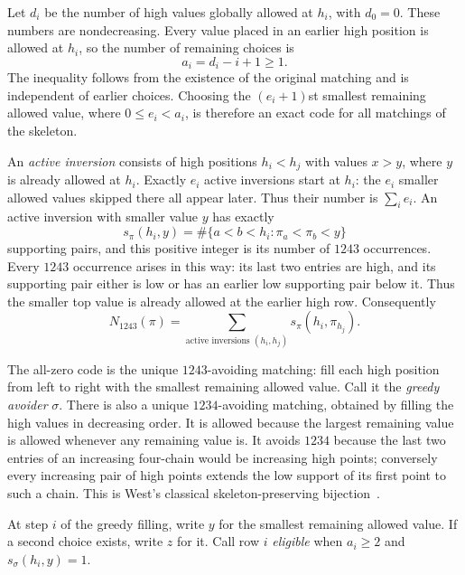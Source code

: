 \documentclass[11pt,letterpaper]{article}
\theoremstyle{remark}\newtheorem{remark}[theorem]{Remark}
\numberwithin{equation}{section}
\begin{document}
Let $d_i$ be the number of high values globally allowed at $h_i$, with
$d_0=0$. These numbers are nondecreasing. Every value placed in an earlier
high position is allowed at $h_i$, so the number of remaining choices is
\begin{equation}\label{upo:1243:eq:choices}
 a_i=d_i-i+1\ge1.
\end{equation}
The inequality follows from the existence of the original matching and
is independent of earlier choices. Choosing the $(e_i+1)$st smallest
remaining allowed value, where $0\le e_i<a_i$, is therefore an exact code
for all matchings of the skeleton.

An \emph{active inversion} consists of high positions $h_i<h_j$ with
values $x>y$, where $y$ is already allowed at $h_i$. Exactly $e_i$ active
inversions start at $h_i$: the $e_i$ smaller allowed values skipped there
all appear later. Thus their number is $\sum_i e_i$. An active inversion
with smaller value $y$ has exactly
\[
 s_\pi(h_i,y)=\#\{a<b<h_i:\pi_a<\pi_b<y\}
\]
supporting pairs, and this positive integer is its number of $1243$
occurrences. Every $1243$ occurrence arises in this way: its last two entries are
high, and its supporting pair either is low or has an earlier low
supporting pair below it. Thus the smaller top value is already allowed
at the earlier high row. Consequently
\begin{equation}\label{upo:1243:eq:active}
 N_{1243}(\pi)=\sum_{\text{active inversions }(h_i,h_j)}
                    s_\pi(h_i,\pi_{h_j}).
\end{equation}

The all-zero code is the unique $1243$-avoiding matching: fill each high
position from left to right with the smallest remaining allowed value.
Call it the \emph{greedy avoider} $\sigma$. There is also a unique
$1234$-avoiding matching, obtained by filling the high values in
decreasing order. It is allowed because the largest remaining value is
allowed whenever any remaining value is. It avoids $1234$ because the
last two entries of an increasing four-chain would be increasing high
points; conversely every increasing pair of high points extends the low
support of its first point to such a chain. This is West's classical
skeleton-preserving bijection~\cite{WestExposition}.

At step $i$ of the greedy filling, write $y$ for the smallest remaining
allowed value. If a second choice exists, write $z$ for it. Call row $i$
\emph{eligible} when $a_i\ge2$ and $s_\sigma(h_i,y)=1$.
\end{document}
